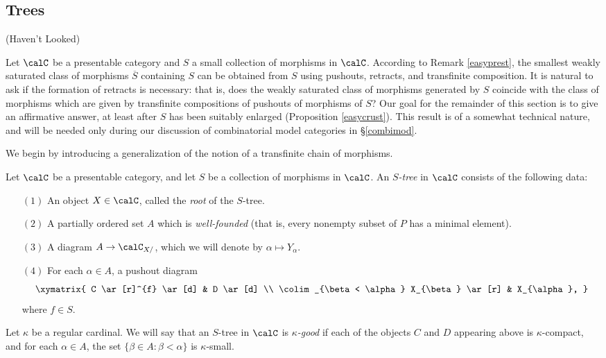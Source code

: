 \begin{CategoryTheory}
\subsection{Trees}
(Haven't Looked)
\begin{Didn't Read}

Let $\calC$ be a presentable category and $S$ a small collection of morphisms in $\calC$.
According to Remark \ref{easyprest}, the smallest weakly saturated class of morphisms $\overline{S}$
containing $S$ can be obtained from $S$ using pushouts, retracts, and transfinite composition.
It is natural to ask if the formation of retracts is necessary: that is, does the weakly saturated class of morphisms generated by $S$ coincide with the class of morphisms which are given by transfinite compositions of pushouts of morphisms of $S$? Our goal for the remainder of this section is to give an affirmative answer, at least after $S$ has been suitably enlarged (Proposition \ref{easycrust}). This result is of a somewhat technical nature, and will be needed only during our discussion of combinatorial model categories in \S \ref{combimod}.

We begin by introducing a generalization of the notion of a transfinite chain of morphisms.

\begin{definition}
Let $\calC$ be a presentable category, and let $S$ be a collection of morphisms in $\calC$. 
An {\it $S$-tree} in $\calC$ consists of the following data:
\begin{itemize}
\item[$(1)$] An object $X \in \calC$, called the {\it root} of the $S$-tree.
\item[$(2)$] A partially ordered set $A$ which is {\it well-founded} (that is, every nonempty subset of $P$ has a minimal element).
\item[$(3)$] A diagram $A \rightarrow \calC_{X/}$, which we will denote by $\alpha \mapsto Y_{\alpha}$.
\item[$(4)$] For each $\alpha \in A$, a pushout diagram
$$ \xymatrix{ C \ar[r]^{f} \ar[d] & D \ar[d] \\
\colim_{\beta < \alpha} X_{\beta} \ar[r] & X_{\alpha}, }$$
where $f \in S$.
\end{itemize}
Let $\kappa$ be a regular cardinal. We will say that an $S$-tree in $\calC$ is {\it $\kappa$-good} if each of the objects $C$ and $D$ appearing above is $\kappa$-compact, and for each
$\alpha \in A$, the set $\{ \beta \in A: \beta < \alpha \}$ is $\kappa$-small.
\end{definition}


\end{Didn't Read}
\end{CategoryTheory}
